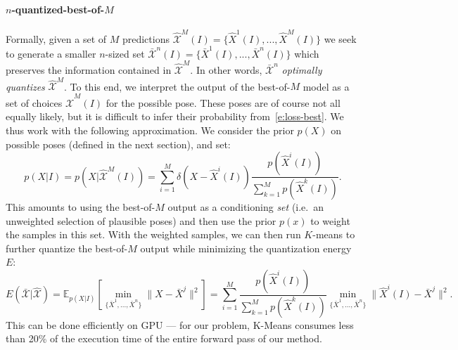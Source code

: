 \paragraph{$n$-quantized-best-of-$M$}
Formally, given a set of $M$ predictions
$\mathcal{\hat X}^M(I) = \{\hat X^1(I), ..., \hat X^M(I)\}$ we seek to generate a smaller $n$-sized set
$\mathcal{\bar X}^n(I) = \{\bar X^1(I), ..., \bar X^n(I)\}$ which preserves the information contained in $\mathcal{\hat X}^M$.
In other words, $\mathcal{\bar X}^n$ \emph{optimally quantizes} $\mathcal{\hat X}^M$.
%
To this end, we interpret the output of the best-of-$M$ model as a set of choices $\mathcal{\hat X}^M(I)$ for the possible pose.
These poses are of course not all equally likely, but it is difficult to infer their probability from~\eqref{e:loss-best}.
We thus work with the following approximation.
We consider the prior $p(X)$ on possible poses (defined in the next section), and set:
\begin{equation}\label{e:conditional}
p(X|I)
=
p(X|\mathcal{\hat X}^M(I))
=
\sum_{i=1}^{M}
\delta({X} - \hat{X}^i(I))
\frac{p(\hat{X}^i(I))}{
\sum_{k=1}^{M} p(\hat{X}^k(I))}.
\end{equation}
This amounts to using the best-of-$M$ output as a conditioning \emph{set} (i.e.~an unweighted selection of plausible poses) and then use the prior $p(x)$ to weight the samples in this set.
With the weighted samples, we can then run $K$-means \cite{lloyd1982least} to further quantize the best-of-$M$ output while minimizing the quantization energy $E$:
\begin{equation}\label{e:loss-quant}
E(\mathcal{\bar X} | \mathcal{\hat X}) = \mathbb{E}_{p(X|I)}
\left[
    \min_{\{\bar X^1, ..., \bar X^n\}} \| X - \bar X^j \|^2
\right]
=
\sum_{i=1}^{M}
\frac{p(\hat{X}^i(I))}{
\sum_{k=1}^{M} p(\hat{X}^k(I))}
\min_{\{\bar X^1,\dots,\bar X^n\}}
\| \hat X^i(I) - \bar X^j \|^2.
\end{equation}
This can be done efficiently on GPU --- for our problem, K-Means consumes less than 20\% of the execution time of the entire forward pass of our method. 


